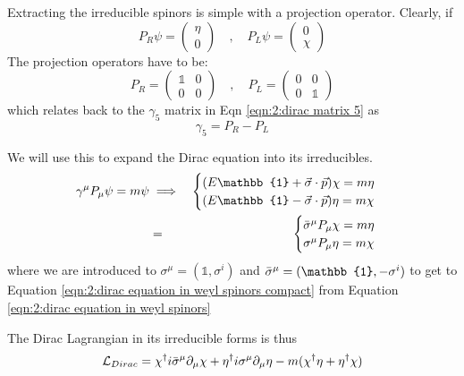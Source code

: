 Extracting the irreducible spinors is simple with a projection operator. Clearly, if
\begin{equation*}
    P_R \psi = \begin{pmatrix} \eta \\ 0 \end{pmatrix} 
    \quad , \quad
    P_L \psi = \begin{pmatrix} 0 \\ \chi \end{pmatrix}
\end{equation*}
The projection operators have to be:
\begin{equation*}
    P_R = \begin{pmatrix} \mathbb{1} & 0 \\ 0 & 0 \end{pmatrix}
    \quad , \quad
    P_L = \begin{pmatrix} 0 & 0 \\ 0 & \mathbb{1} \end{pmatrix}
\end{equation*}
which relates back to the $\gamma_5$ matrix in Eqn \ref{eqn:2:dirac matrix 5} as
\begin{equation}
    \gamma_5 = P_R - P_L
\end{equation}

We will use this to expand the Dirac equation into its irreducibles.
\begin{eqnarray}
    \gamma^\mu P_\mu \psi = m \psi
    &\implies&
    \begin{cases}
        (E \mathbb{1} + \Vec{\sigma} \cdot \Vec{p}) \chi = m \eta\\
        (E \mathbb{1} - \Vec{\sigma} \cdot \Vec{p}) \eta = m \chi
    \end{cases}
    \label{eqn:2:dirac equation in weyl spinors}
    \\
    &=&
    \begin{cases}
        \Bar{\sigma}^\mu P_\mu \chi = m \eta \\
        \sigma^\mu P_\mu \eta = m \chi
    \end{cases}
    \label{eqn:2:dirac equation in weyl spinors compact}
\end{eqnarray}
where we are introduced to $\sigma^\mu = (\mathbb{1}, \sigma^i)$ and $\Bar{\sigma}^\mu = (\mathbb{1}, - \sigma^i)$ to get to Equation \ref{eqn:2:dirac equation in weyl spinors compact} from Equation \ref{eqn:2:dirac equation in weyl spinors}

The Dirac Lagrangian in its irreducible forms is thus
\begin{equation}
    \mathcal{L}_{Dirac} = \chi^\dagger i \Bar{\sigma}^\mu \partial_\mu \chi + \eta^\dagger i \sigma^\mu \partial_\mu \eta - m(\chi^\dagger \eta + \eta^\dagger \chi)
    \label{eqn:2:dirac lagrangian in weyl spinors}
\end{equation}


